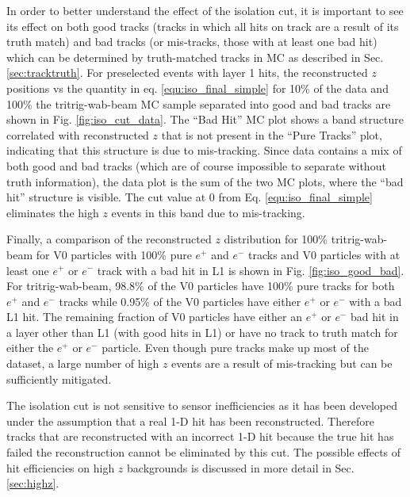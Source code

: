 
In order to better understand the effect of the isolation cut, it is important to see its effect on both good tracks (tracks in which all hits on track are a result of its truth match) and bad tracks (or mis-tracks, those with at least one bad hit) which can be determined by truth-matched tracks in MC as described in Sec. \ref{sec:tracktruth}. For preselected events with layer 1 hits, the reconstructed $z$ positions vs the quantity in eq. \ref{equ:iso_final_simple} for 10\% of the data and 100\% the tritrig-wab-beam MC sample separated into good and bad tracks are shown in Fig. \ref{fig:iso_cut_data}. The ``Bad Hit'' MC plot shows a band structure correlated with reconstructed $z$ that is not present in the ``Pure Tracks'' plot, indicating that this structure is due to mis-tracking. Since data contains a mix of both good and bad tracks (which are of course impossible to separate without truth information), the data plot is the sum of the two MC plots, where the ``bad hit'' structure is visible. The cut value at 0 from Eq. \ref{equ:iso_final_simple} eliminates the high $z$ events in this band due to mis-tracking. %

Finally, a comparison of the reconstructed $z$ distribution for 100\% tritrig-wab-beam for V0 particles with 100\% pure $e^+$ and $e^-$ tracks and V0 particles with at least one $e^+$ or $e^-$ track with a bad hit in L1 is shown in Fig. \ref{fig:iso_good_bad}. For tritrig-wab-beam, 98.8\% of the V0 particles have 100\% pure tracks for both $e^+$ and $e^-$ tracks while 0.95\% of the V0 particles have either $e^+$ or $e^-$ with a bad L1 hit. The remaining fraction of V0 particles have either an $e^+$ or $e^-$ bad hit in a layer other than L1 (with good hits in L1) or have no track to truth match for either the $e^+$ or $e^-$ particle. Even though pure tracks make up most of the dataset, a large number of high $z$ events are a result of mis-tracking but can be sufficiently mitigated.

The isolation cut is not sensitive to sensor inefficiencies as it has been developed under the assumption that a real 1-D hit has been reconstructed. Therefore tracks that are reconstructed with an incorrect 1-D hit because the true hit has failed the reconstruction cannot be eliminated by this cut. The possible effects of hit efficiencies on high $z$ backgrounds is discussed in more detail in Sec. \ref{sec:highz}.

